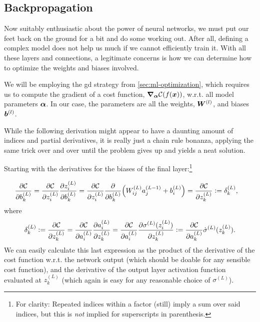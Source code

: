 \documentclass[Thesis.tex]{subfiles}
\begin{document}
\subsection{Backpropagation}
\label{sec:ml-backprop}

Now suitably enthusiastic about the power of neural networks, we must put our
feet back on the ground for a bit and do some working out. After all, defining a
complex model does not help us much if we cannot efficiently train it. With all
these layers and connections, a legitimate concerns is how we can determine how
to optimize the weights and biases involved.

We will be employing the \acrlong{gd} strategy from \cref{sec:ml-optimization},
which requires us to compute the gradient of a cost function,
$\grad_{\bm{\alpha}}\mathcal{C}(f(\bm{x}))$, w.r.t. all model parameters $\bm{\alpha}$. In
our case, the parameters are all the weights, $\bm{W}^{(l)}$, and biases $\bm{b}^{(l)}$.

While the following derivation might appear to have a daunting amount of indices
and partial derivatives, it is really just a chain rule bonanza, applying the
same trick over and over until the problem gives up and yields a neat
solution.

Starting with the derivatives for the biases of the final layer:\footnote{For
  clarity: Repeated indices within a factor (still) imply a sum over said
  indices, but this is \emph{not} implied for superscripts in parenthesis.}

\begin{align}
  \pdv{\mathcal{C}}{b_k^{(L)}} &=
\pdv{\mathcal{C}}{z_i^{(L)}}\pdv{z_i^{(L)}}{b_k^{(L)}}
=\pdv{\mathcal{C}}{z_i^{(L)}}\pdv{}{b_k^{(L)}}\qty(W_{ij}^{(L)}a_j^{(L-1)} +
b_i^{(L)}) = \pdv{\mathcal{C}}{z_k^{(L)}}\vcentcolon= \delta_k^{(L)},
\end{align}
where
\begin{align}
  \delta_k^{(L)}\vcentcolon= \pdv{\mathcal{C}}{z_k^{(L)}} =
\pdv{\mathcal{C}}{a^{(L)}_{i}}\pdv{a_i^{(L)}}{z_k^{(L)}} =
\pdv{\mathcal{C}}{a^{(L)}_{i}}\pdv{\sigma^{(L)}(z_i^{(L)})}{z_k^{(L)}} \vcentcolon=
\pdv{\mathcal{C}}{a^{(L)}_{k}}\dot\sigma^{(L)}(z_k^{(L)}).
\end{align}
We can easily calculate this last expression as the product of the derivative of
the cost function w.r.t. the network output (which should be doable for any
sensible cost function), and the derivative of the output layer activation
function evaluated at $z_k^{(L)}$ (which again is easy for any reasonable choice
of $\sigma^{(L)}$).
\end{document}
